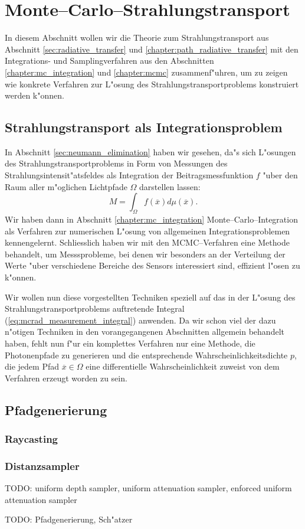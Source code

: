 	\chapter{Monte--Carlo--Strahlungstransport}\label{sec:mc_radiativetransfer}
	In diesem Abschnitt wollen wir die Theorie zum Strahlungstransport aus Abschnitt \ref{sec:radiative_transfer} und \ref{chapter:path_radiative_transfer} mit den Integrations- und Samplingverfahren aus den Abschnitten \ref{chapter:mc_integration} und \ref{chapter:mcmc} zusammenf"uhren, um zu zeigen wie konkrete Verfahren zur L"osung des Strahlungstransportproblems konstruiert werden k"onnen.
	\section{Strahlungstransport als Integrationsproblem}
	In Abschnitt \ref{sec:neumann_elimination} haben wir gesehen, da"s sich L"osungen des Strahlungstransportproblems in Form von Messungen des Strahlungsintensit"atsfeldes als Integration der Beitragsmessfunktion $f$ "uber den Raum aller m"oglichen Lichtpfade $\Omega$ darstellen lassen:
	\begin{equation}
		M=\int_\Omega f({\overline x})d\mu({\overline x}).
		\label{eq:mcrad_measurement_integral}
	\end{equation}
	Wir haben dann in Abschnitt \ref{chapter:mc_integration} Monte--Carlo--Integration als Verfahren zur numerischen L"osung von allgemeinen Integrationsproblemen kennengelernt. Schliesslich haben wir mit den MCMC--Verfahren eine Methode behandelt, um Messsprobleme, bei denen wir besonders an der Verteilung der Werte "uber verschiedene Bereiche des Sensors interessiert sind, effizient l"osen zu k"onnen.
	
	Wir wollen nun diese vorgestellten Techniken speziell auf das in der L"osung des Strahlungstransportproblems auftretende Integral (\ref{eq:mcrad_measurement_integral}) anwenden. Da wir schon viel der dazu n"otigen Techniken in den vorangegangenen Abschnitten allgemein behandelt haben, fehlt nun f"ur ein komplettes Verfahren nur eine Methode, die Photonenpfade zu generieren und die entsprechende Wahrscheinlichkeitsdichte $p$, die jedem Pfad ${\overline x}\in\Omega$ eine differentielle Wahrscheinlichkeit zuweist von dem Verfahren erzeugt worden zu sein.
	
	\section{Pfadgenerierung}
	
	\subsection{Raycasting}
	\subsection{Distanzsampler}
	TODO: uniform depth sampler, uniform attenuation sampler, enforced uniform attenuation sampler
	
	TODO: Pfadgenerierung, Sch"atzer
	